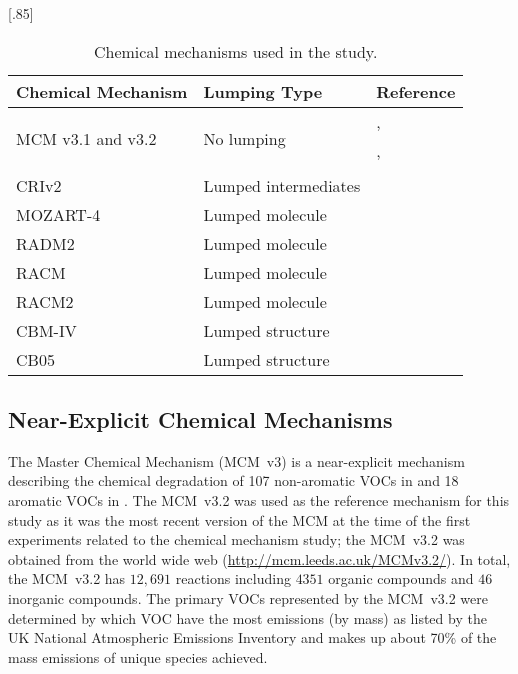 \begin{table}
    \begin{center}
        \caption{Chemical mechanisms used in the study.}
        \scalebox{.85}[.85]{\begin{tabular}{lll}
                \hline \hline
                \textbf{Chemical Mechanism} & \textbf{Lumping Type} & \textbf{Reference} \\
                \hline \hline
                \multirow{3}{*}{MCM v3.1 and v3.2} & \multirow{3}{*}{No lumping} & \citet{Jenkin:1997}, \citet{Jenkin:2003} \\
                & & \citet{Saunders:2003}, \citet{Bloss:2005} \\
                & & \citet{MCM_Site} \\
                CRIv2 & Lumped intermediates & \citet{Jenkin:2008} \\
                MOZART-4 & Lumped molecule & \citet{Emmons:2010} \\
                RADM2 & Lumped molecule & \citet{Stockwell:1990} \\
                RACM & Lumped molecule & \citet{Stockwell:1997} \\
                RACM2 & Lumped molecule & \citet{Goliff:2013} \\
                CBM-IV & Lumped structure & \citet{Gery:1989} \\
                CB05 & Lumped structure & \citet{Yarwood:2005} \\
                \hline \hline
            \end{tabular}
        }
        \label{t:mechanisms}
    \end{center}
\end{table}

\subsection{Near-Explicit Chemical Mechanisms} \label{ss:near_explicit}
The Master Chemical Mechanism (MCM~v3) is a near-explicit mechanism describing the chemical degradation of 107 non-aromatic VOCs in \citep{Saunders:2003} and 18 aromatic VOCs in \citep{Jenkin:2003}. 
The MCM~v3.2 was used as the reference mechanism for this study as it was the most recent version of the MCM at the time of the first experiments related to the chemical mechanism study; the MCM~v3.2 was obtained from the world wide web (\mbox{\url{http://mcm.leeds.ac.uk/MCMv3.2/}}).
In total, the MCM~v3.2 has $12,691$ reactions including $4351$ organic compounds and $46$ inorganic compounds. 
The primary VOCs represented by the MCM~v3.2 were determined by which VOC have the most emissions (by mass) as listed by the UK National Atmospheric Emissions Inventory and makes up about 70\% of the mass emissions of unique species achieved.

